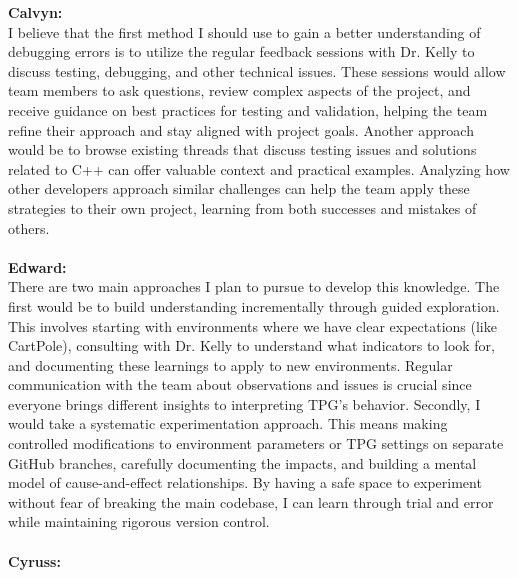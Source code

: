 \documentclass[12pt, titlepage]{article}
\begin{document}
\noindent \textbf{Calvyn:}\\

\noindent I believe that the first method I should use to gain a better understanding of debugging errors is to utilize the regular feedback sessions with Dr. Kelly to discuss testing, debugging, and other technical issues. These sessions would allow team members to ask questions, review complex aspects of the project, and receive guidance on best practices for testing and validation, helping the team refine their approach and stay aligned with project goals. Another approach would be to browse existing threads that discuss testing issues and solutions related to C++ can offer valuable context and practical examples. Analyzing how other developers approach similar challenges can help the team apply these strategies to their own project, learning from both successes and mistakes of others.
\\\\
\textbf{Edward:}\\

\noindent There are two main approaches I plan to pursue to develop this knowledge. The first would be to build understanding incrementally through guided exploration. This involves starting with environments where we have clear expectations (like CartPole), consulting with Dr. Kelly to understand what indicators to look for, and documenting these learnings to apply to new environments. Regular communication with the team about observations and issues is crucial since everyone brings different insights to interpreting TPG's behavior.
Secondly, I would take a systematic experimentation approach. This means making controlled modifications to environment parameters or TPG settings on separate GitHub branches, carefully documenting the impacts, and building a mental model of cause-and-effect relationships. By having a safe space to experiment without fear of breaking the main codebase, I can learn through trial and error while maintaining rigorous version control.
\\\\

\noindent \textbf{Cyruss:}\\
\end{document}
